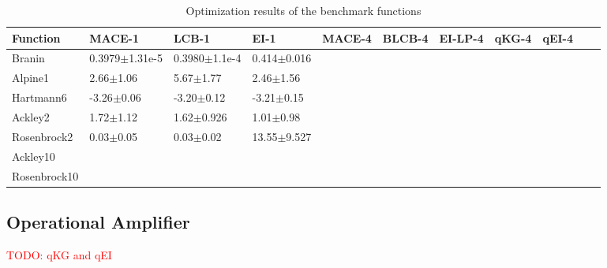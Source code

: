 \begin{table}[htbp]
    \centering
    \caption{Optimization results of the benchmark functions}
    \label{tab:summaryanalygical}
    \begin{tabular}{lllllllllll}
        \toprule
        Function           & MACE-1             & LCB-1             & EI-1            & MACE-4  & BLCB-4  & EI-LP-4 & qKG-4 & qEI-4  \\ \midrule
         Branin            & 0.3979$\pm$1.31e-5 & 0.3980$\pm$1.1e-4 & 0.414$\pm$0.016 &         &         &         &       &        \\
         Alpine1           & 2.66$\pm$1.06      & 5.67$\pm$1.77     & 2.46$\pm$1.56   &         &         &         &       &        \\
         Hartmann6         & -3.26$\pm$0.06     & -3.20$\pm$0.12    & -3.21$\pm$0.15  &         &         &         &       &        \\
         Ackley2           & 1.72$\pm$1.12      & 1.62$\pm$0.926    & 1.01$\pm$0.98   &         &         &         &       &        \\
         Rosenbrock2       & 0.03$\pm$0.05      & 0.03$\pm$0.02     & 13.55$\pm$9.527 &         &         &         &       &        \\
         Ackley10          &                    &                   &                 &         &         &         &       &        \\
         Rosenbrock10      &                    &                   &                 &         &         &         &       &        \\
        \bottomrule
    \end{tabular}
\end{table}

\subsection{Operational Amplifier}

\textcolor{red}{TODO: qKG and qEI}

